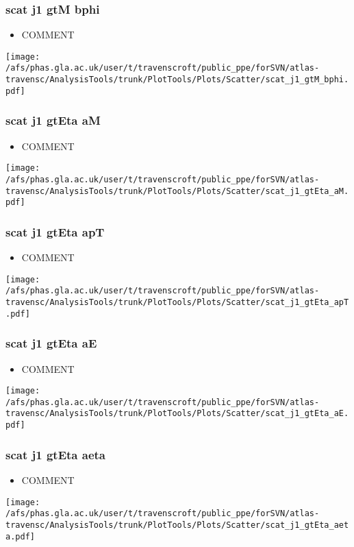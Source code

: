 \documentclass{beamer}
\begin{document}
\begin{frame}
\frametitle{scat j1 gtM bphi}
\begin{itemize}
\item COMMENT
\end{itemize}
\begin{center}
\texttt{[image: /afs/phas.gla.ac.uk/user/t/travenscroft/public\_ppe/forSVN/atlas-travensc/AnalysisTools/trunk/PlotTools/Plots/Scatter/scat\_j1\_gtM\_bphi.pdf]}
\end{center}
\end{frame}

\begin{frame}
\frametitle{scat j1 gtEta aM}
\begin{itemize}
\item COMMENT
\end{itemize}
\begin{center}
\texttt{[image: /afs/phas.gla.ac.uk/user/t/travenscroft/public\_ppe/forSVN/atlas-travensc/AnalysisTools/trunk/PlotTools/Plots/Scatter/scat\_j1\_gtEta\_aM.pdf]}
\end{center}
\end{frame}

\begin{frame}
\frametitle{scat j1 gtEta apT}
\begin{itemize}
\item COMMENT
\end{itemize}
\begin{center}
\texttt{[image: /afs/phas.gla.ac.uk/user/t/travenscroft/public\_ppe/forSVN/atlas-travensc/AnalysisTools/trunk/PlotTools/Plots/Scatter/scat\_j1\_gtEta\_apT.pdf]}
\end{center}
\end{frame}

\begin{frame}
\frametitle{scat j1 gtEta aE}
\begin{itemize}
\item COMMENT
\end{itemize}
\begin{center}
\texttt{[image: /afs/phas.gla.ac.uk/user/t/travenscroft/public\_ppe/forSVN/atlas-travensc/AnalysisTools/trunk/PlotTools/Plots/Scatter/scat\_j1\_gtEta\_aE.pdf]}
\end{center}
\end{frame}

\begin{frame}
\frametitle{scat j1 gtEta aeta}
\begin{itemize}
\item COMMENT
\end{itemize}
\begin{center}
\texttt{[image: /afs/phas.gla.ac.uk/user/t/travenscroft/public\_ppe/forSVN/atlas-travensc/AnalysisTools/trunk/PlotTools/Plots/Scatter/scat\_j1\_gtEta\_aeta.pdf]}
\end{center}
\end{frame}
\end{document}
